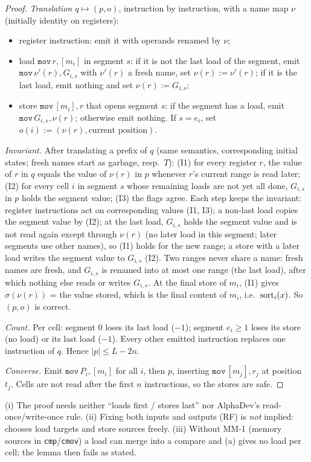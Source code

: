 \begin{proof}
\emph{Translation $q\mapsto(p,o)$}, instruction by instruction, with a name map $\nu$ (initially identity on registers):
\begin{itemize}
\item register instruction: emit it with operands renamed by $\nu$;
\item load $\texttt{mov}\,r,[m_i]$ in segment $s$: if it is not the last load of the segment, emit $\texttt{mov}\,\nu'(r),G_{i,s}$
      with $\nu'(r)$ a fresh name, set $\nu(r):=\nu'(r)$; if it is the last load, emit nothing and set $\nu(r):=G_{i,s}$;
\item store $\texttt{mov}\,[m_i],r$ that opens segment $s$: if the segment has a load, emit $\texttt{mov}\,G_{i,s},\nu(r)$;
      otherwise emit nothing. If $s=e_i$, set $o(i):=(\nu(r),\text{current position})$.
\end{itemize}
\emph{Invariant.} After translating a prefix of $q$ (same semantics, corresponding initial states; fresh names start
as garbage, resp.\ $T$): (I1) for every register $r$, the value of $r$ in $q$ equals the value of $\nu(r)$ in $p$
whenever $r$'s current range is read later; (I2) for every cell $i$ in segment $s$ whose remaining loads are not
yet all done, $G_{i,s}$ in $p$ holds the segment value; (I3) the flags agree.
Each step keeps the invariant: register instructions act on corresponding values (I1, I3); a non-last load copies the segment
value by (I2); at the last load, $G_{i,s}$ holds the segment value and is not read again except through $\nu(r)$ (no later
load in this segment; later segments use other names), so (I1) holds for the new range; a store with a later load writes the
segment value to $G_{i,s}$ (I2). Two ranges never share a name: fresh names are fresh, and $G_{i,s}$ is renamed into at most
one range (the last load), after which nothing else reads or writes $G_{i,s}$. At the final store of $m_i$, (I1) gives
$\sigma(\nu(r))$ = the value stored, which is the final content of $m_i$, i.e.\ $\mathrm{sort}_i(x)$. So $(p,o)$ is correct.

\emph{Count.} Per cell: segment 0 loses its last load ($-1$); segment $e_i\ge1$ loses its store (no load) or its last
load ($-1$). Every other emitted instruction replaces one instruction of $q$. Hence $|p|\le L-2n$.

\emph{Converse.} Emit $\texttt{mov}\,P_i,[m_i]$ for all $i$, then $p$, inserting $\texttt{mov}\,[m_j],r_j$ at position $t_j$.
Cells are not read after the first $n$ instructions, so the stores are safe.
\end{proof}
\begin{remark} (i) The proof needs neither ``loads first / stores last'' nor AlphaDev's read-once/write-once rule.
(ii) Fixing both inputs and outputs (RF) is \emph{not} implied: \MM{} chooses load targets and store sources freely.
(iii) Without MM-1 (memory sources in \texttt{cmp}/\texttt{cmov}) a load can merge into a compare and (a) gives no
load per cell; the lemma then fails as stated.
\end{remark}


